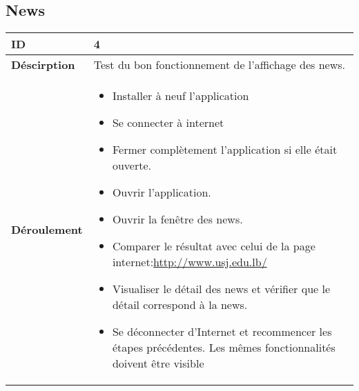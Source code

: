 		\subsection{News}
					 \begin{longtable}{m{4cm}|p{10cm}|}
					 \textbf{ ID} & 4 \\
					 \hline \textbf{Déscirption} & Test du bon fonctionnement de l'affichage des news.\\
					 \hline \textbf{Déroulement} &
						 \begin{itemize}
						  	\item Installer à neuf l'application
						  	\item Se connecter à internet
							 \item Fermer complètement l'application si elle était ouverte.
							 \item Ouvrir l'application.
							 \item Ouvrir la fenêtre des news.
							 \item Comparer le résultat avec celui de la page internet:\url{http://www.usj.edu.lb/}
							 \item Visualiser le détail des news et vérifier que le détail correspond à la news.
							\item Se déconnecter d'Internet et recommencer les étapes précédentes. Les mêmes fonctionnalités doivent être visible
						 \end{itemize}
					 \\
				 \end{longtable} 

